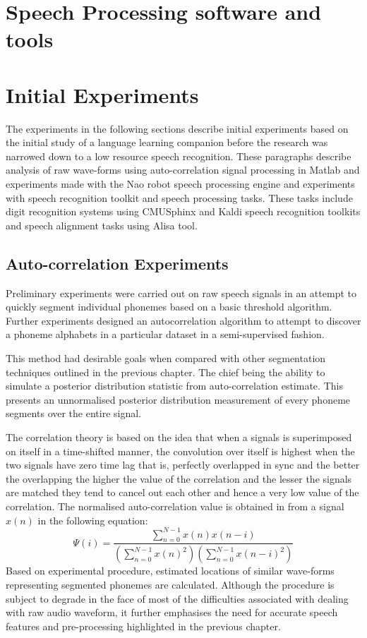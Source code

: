 \section{Speech Processing software and tools}
\section{Initial Experiments}
The experiments in the following sections describe initial experiments based on the initial study of a language learning companion before the research was narrowed down to a low resource speech recognition.  These paragraphs describe analysis of raw wave-forms using auto-correlation signal processing in Matlab and experiments made with the Nao robot speech processing engine and experiments with speech recognition toolkit and speech processing tasks.  These tasks include digit recognition systems using CMUSphinx and Kaldi speech recognition toolkits and speech alignment tasks using Alisa tool.
\subsection{Auto-correlation Experiments}
Preliminary experiments were carried out on raw speech signals in an attempt to quickly segment individual phonemes based on a basic threshold algorithm.  Further experiments designed an autocorrelation algorithm to attempt to discover a phoneme alphabets in a particular dataset in a semi-supervised fashion.
 
This method had desirable goals when compared with other segmentation techniques outlined in the previous chapter. The chief being the ability to simulate a posterior distribution statistic from auto-correlation estimate.  This presents an unnormalised posterior distribution measurement of every phoneme segments over the entire signal.

The correlation theory is based on the idea that when a signals is superimposed on itself in a time-shifted manner, the convolution over itself is highest when the two signals have zero time lag that is, perfectly overlapped in sync and the better the overlapping the higher the value of the correlation and the lesser the signals are matched they tend to cancel out each other and hence a very low value of the correlation.  The normalised auto-correlation value is obtained in \cite{picone1996fundamentals} from a signal $x(n)$ in the following equation:
\begin{equation}
    \Psi(i)=\frac{\sum_{n=0}^{N-1}x(n)x(n-i)}{\left(\sum_{n=0}^{N-1}x(n)^2\right)\left(\sum_{n=0}^{N-1}x(n-i)^2\right)}\label{c3eq_corr}
\end{equation}
Based on experimental procedure, estimated locations of similar wave-forms representing segmented phonemes are calculated.  Although the procedure is subject to degrade in the face of most of the difficulties associated with dealing with raw audio waveform, it further emphasises the need for accurate speech features and pre-processing highlighted in the previous chapter.


